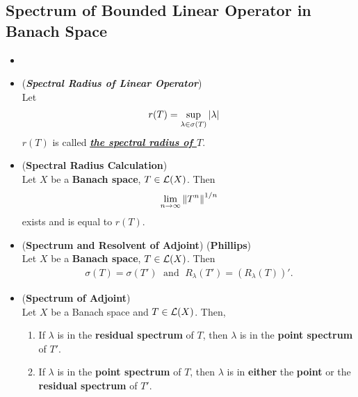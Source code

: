 \documentclass[11pt]{article}
\begin{document}
\subsection{Spectrum of Bounded Linear Operator in Banach Space}
\begin{itemize}
\item 

\item \begin{definition} (\emph{\textbf{Spectral Radius of Linear Operator}})\\
Let 
\begin{align*}
r(T) &= \sup_{\lambda \in \sigma(T)} \left\lvert \lambda \right\rvert
\end{align*}
$r(T)$ is called  \underline{\textbf{\emph{the spectral radius of $T$}}}. 
\end{definition}

\item \begin{proposition} (\textbf{Spectral Radius Calculation}) \citep{reed1980methods}\\
Let $X$ be a \textbf{Banach space}, $T \in {\mathcal L}(X)$. Then 
\begin{align*}
\lim\limits_{n\rightarrow \infty}\left\|T^n\right\|_{}^{1/n}
\end{align*}
exists and is equal to $r(T)$. 
\end{proposition}

\item \begin{theorem} (\textbf{Spectrum and Resolvent of Adjoint}) (\textbf{Phillips}) \citep{reed1980methods}\\ 
Let $X$ be a \textbf{Banach space},  $T \in {\mathcal L}(X)$. Then 
\begin{align*}
\sigma(T) = \sigma(T')\; \text{ and }\; R_{\lambda}(T') = (R_{\lambda}(T))'.
\end{align*}
\end{theorem}

\item \begin{proposition}  (\textbf{Spectrum of Adjoint}) \citep{reed1980methods}\\ 
Let $X$ be a Banach space and $T \in {\mathcal L}(X)$. Then, 
\begin{enumerate}
\item If $\lambda$ is in the \textbf{residual spectrum} of $T$, then $\lambda$ is in the \textbf{point spectrum} of $T'$. 
\item If  $\lambda$ is in the \textbf{point spectrum} of $T$, then $\lambda$ is in \textbf{either} the \textbf{point} or the \textbf{residual spectrum} of $T'$. 
\end{enumerate}
\end{proposition}
\end{itemize}
\end{document}
